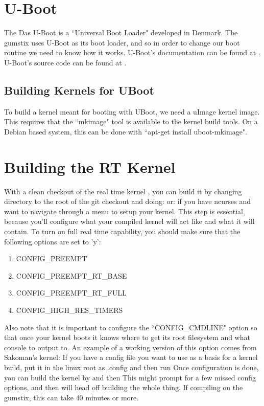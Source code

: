 \section{U-Boot}
The Das U-Boot is a ``Universal Boot Loader" \cite{UBoot} developed in Denmark.  The gumstix uses U-Boot as its boot loader, and so in order to change our boot routine we need to know how it works.  U-Boot's documentation can be found at \cite{UBootDocs}. U-Boot's source code can be found at \cite{UBootSource}.
\subsection{Building Kernels for UBoot}
To build a kernel meant for booting with UBoot, we need a uImage kernel image.  This requires that the ``mkimage" tool is available to the kernel build tools.  On a Debian based system, this can be done with ``apt-get install uboot-mkimage".
\section{Building the RT Kernel}
With a clean checkout of the real time kernel \cite{RealTimeLinuxGit}, you can build it by changing directory to the root of the git checkout and doing:  or:  if you have ncurses and want to navigate through a menu to setup your kernel.  This step is essential, because you'll configure what your compiled kernel will act like and what it will contain.  To turn on full real time capability, you should make sure that the following options are set to 'y':
\begin{enumerate}
\item CONFIG\_PREEMPT
\item CONFIG\_PREEMPT\_RT\_BASE
\item CONFIG\_PREEMPT\_RT\_FULL
\item CONFIG\_HIGH\_RES\_TIMERS
\end{enumerate}

Also note that it is important to configure the ``CONFIG\_CMDLINE" option so that once your kernel boots it knows where to get its root filesystem and what console to output to.  An example of a working version of this option comes from Sakoman's kernel:
If you have a config file you want to use as a basis for a kernel build, put it in the linux root as .config and then run 
Once configuration is done, you can build the kernel by  and then   This might prompt for a few missed config options, and then will head off building the whole thing.  If compiling on the gumstix, this can take 40 minutes or more.

